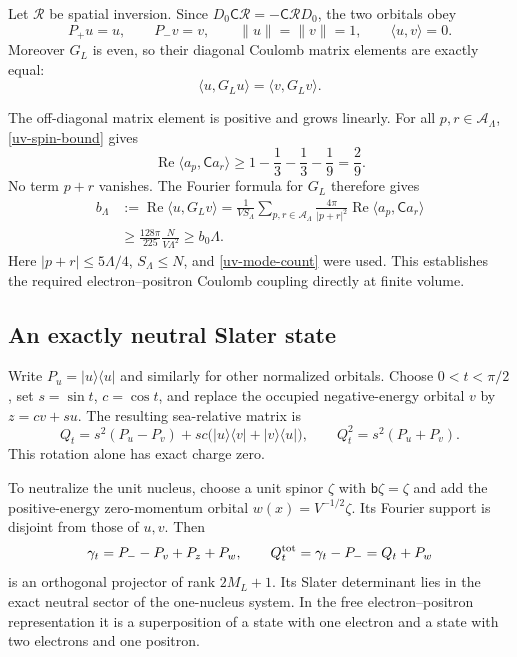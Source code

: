 Let $\mathcal R$ be spatial inversion.  Since
$D_0\mathsf C\mathcal R=-\mathsf C\mathcal R D_0$, the two orbitals obey
\[
 P_+u=u,\qquad P_-v=v,\qquad
 \|u\|=\|v\|=1,\qquad \langle u,v\rangle=0.
\]
Moreover $G_L$ is even, so their diagonal Coulomb matrix elements are
exactly equal:
\begin{equation}
 \langle u,G_Lu\rangle=\langle v,G_Lv\rangle.
 \label{uv-equal-diagonal}
\end{equation}

The off-diagonal matrix element is positive and grows linearly.  For all
$p,r\in\mathcal A_\Lambda$, \eqref{uv-spin-bound} gives
\[
 \operatorname{Re}\langle a_p,\mathsf C a_r\rangle
 \ge1-\frac13-\frac13-\frac19=\frac29.
\]
No term $p+r$ vanishes.  The Fourier formula for $G_L$ therefore gives
\begin{align}
 b_\Lambda&:=\operatorname{Re}\langle u,G_Lv\rangle
   =\frac1{VS_\Lambda}\sum_{p,r\in\mathcal A_\Lambda}
       \frac{4\pi}{|p+r|^2}
       \operatorname{Re}\langle a_p,\mathsf C a_r\rangle\nonumber\\
 &\ge\frac{128\pi}{225}\frac{N}{V\Lambda^2}
 \ge b_0\Lambda.
 \label{uv-positive-matrix-element}
\end{align}
Here $|p+r|\le5\Lambda/4$, $S_\Lambda\le N$, and
\eqref{uv-mode-count} were used.  This establishes the required
electron--positron Coulomb coupling directly at finite volume.

\subsection{An exactly neutral Slater state}
\label{uv-neutral-state}

Write $P_u=|u\rangle\langle u|$ and similarly for other normalized orbitals.
Choose $0<t<\pi/2$, set $s=\sin t$, $c=\cos t$, and replace the occupied
negative-energy orbital $v$ by $z=cv+su$.  The resulting sea-relative
matrix is
\begin{equation}
 Q_t=s^2(P_u-P_v)+sc\bigl(|u\rangle\langle v|
                              +|v\rangle\langle u|\bigr),
 \qquad Q_t^2=s^2(P_u+P_v).
 \label{uv-pair-rotation}
\end{equation}
This rotation alone has exact charge zero.

To neutralize the unit nucleus, choose a unit spinor $\zeta$ with
$\mathsf b\zeta=\zeta$ and add the positive-energy zero-momentum orbital
$w(x)=V^{-1/2}\zeta$.  Its Fourier support is disjoint from those of $u,v$.
Then
\begin{equation}
 \gamma_t=P_- -P_v+P_z+P_w,
 \qquad Q^{\rm tot}_t=\gamma_t-P_-=Q_t+P_w
 \label{uv-full-projector}
\end{equation}
is an orthogonal projector of rank $2M_L+1$.  Its Slater determinant lies
in the exact neutral sector of the one-nucleus system.  In the free
electron--positron representation it is a superposition of a state with
one electron and a state with two electrons and one positron.

